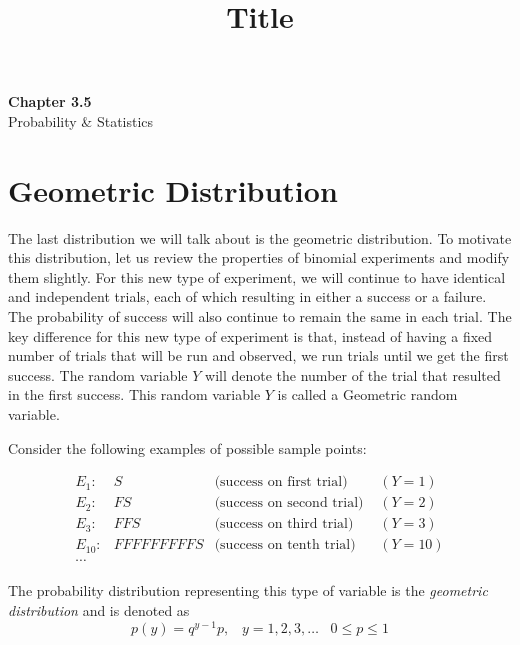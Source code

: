 \documentclass[11pt]{article}
\theoremstyle{definition}
\begin{document}
\title{Title}

\thispagestyle{empty}

\begin{center}
{\LARGE \bf Chapter 3.5}\\
{\large Probability \& Statistics}
\end{center}

\section{Geometric Distribution}

The last distribution we will talk about is the geometric distribution. To motivate this distribution, let us review the properties of binomial experiments and modify them slightly. For this new type of experiment, we will continue to have identical and independent trials, each of which resulting in either a success or a failure. The probability of success will also continue to remain the same in each trial. The key difference for this new type of experiment is that, instead of having a fixed number of trials that will be run and observed, we run trials until we get the first success. The random variable $Y$ will denote the number of the trial that resulted in the first success. This random variable $Y$ is called a Geometric random variable.

Consider the following examples of possible sample points:

$$
	\begin{aligned}
		E_1: & S & \text{(success on first trial) } & (Y=1) \\
		E_2: & FS & \text{(success on second trial) } & (Y=2) \\
		E_3: & FFS & \text{(success on third trial) } & (Y=3) \\
		E_{10}: & FFFFFFFFFS & \text{(success on tenth trial) } & (Y=10) \\
		\cdots & & &
	\end{aligned}
$$

\begin{shaded}
	The probability distribution representing this type of variable is the \textit{geometric distribution} and is denoted as
	$$
		p(y) = q^{y-1}p, \;\;\; y=1, 2, 3, \ldots \;\;\; 0 \leq p \leq 1
	$$
\end{shaded}
\end{document}
